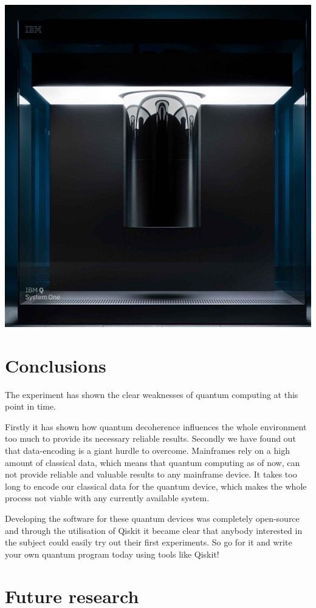 \documentclass[a0,portrait]{a0poster}
\begin{document}
\begin{multicols}{2}
\color{black}


\begin{center}\vspace{1cm}
\includegraphics[width=0.5\linewidth]{QCTest}
\end{center}\vspace{1cm}


\color{HoGentAccent1} 
\section*{Conclusions}
\color{black}
The experiment has shown the clear weaknesses of quantum computing at this point in time.

Firstly it has shown how quantum decoherence influences the whole environment too much to provide its necessary reliable results. Secondly we have found out that data-encoding is a giant hurdle to overcome. Mainframes rely on a high amount of classical data, which means that quantum computing as of now, can not provide reliable and valuable results to any mainframe device. It takes too long to encode our classical data for the quantum device, which makes the whole process not viable with any currently available system.

Developing the software for these quantum devices was completely open-source and through the utilisation of Qiskit it became clear that anybody interested in the subject could easily try out their first experiments. So go for it and write your own quantum program today using tools like Qiskit!
\color{HoGentAccent1} 
\section*{Future research}
\color{black}


\end{multicols}
\end{document}
